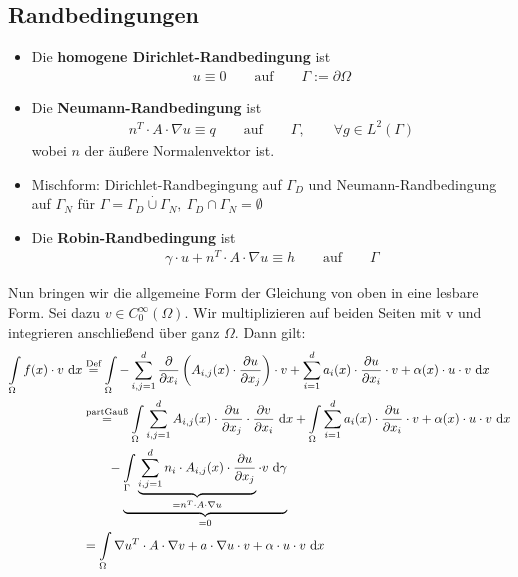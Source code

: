 \subsection*{Randbedingungen}
\begin{itemize}
\item Die \textbf{homogene Dirichlet-Randbedingung} ist
\begin{align*}
u\equiv0\qquad\text{auf}\qquad\Gamma:=\partial\Omega
\end{align*}
\item Die \textbf{Neumann-Randbedingung} ist
\begin{align*}
n^T\cdot A\cdot\nabla u\equiv q\qquad\text{auf}\qquad\Gamma,\qquad\forall g\in L^2(\Gamma)
\end{align*}
wobei $n$ der äußere Normalenvektor ist.
\item Mischform: Dirichlet-Randbegingung auf $\Gamma_D$ und Neumann-Randbedingung auf $\Gamma_N$ für $\Gamma=\Gamma_D\stackrel{\cdot}{\cup}\Gamma_N,~\Gamma_D\cap\Gamma_N=\emptyset$
\item Die \textbf{Robin-Randbedingung} ist
\begin{align*}
\gamma\cdot u+n^T\cdot A\cdot\nabla u\equiv h\qquad\text{auf}\qquad\Gamma
\end{align*}
\end{itemize}

Nun bringen wir die allgemeine Form der Gleichung von oben in eine lesbare Form.
Sei dazu $v\in C_0^\infty(\Omega)$. Wir multiplizieren auf beiden Seiten mit v und integrieren anschließend über ganz $\Omega$. Dann gilt:
\begin{align*}
\int\limits_\Omega f(x)\cdot v\text{ d} x
&\stackrel{\text{Def}}{=}
\int\limits_\Omega-\sum\limits_{i,j=1}^d\frac{\partial}{\partial x_i}\left(A_{i,j}(x)\cdot\frac{\partial u}{\partial x_j}\right)\cdot v+\sum\limits_{i=1}^d a_i(x)\cdot\frac{\partial u}{\partial x_i}\cdot v+\alpha(x)\cdot u\cdot v\text{ d} x\\ 
&\stackrel{\text{partGauß}}{=}
\int\limits_\Omega\sum\limits_{i,j=1}^d A_{i,j}(x)\cdot\frac{\partial u}{\partial x_j}\cdot\frac{\partial v}{\partial x_i}\text{ d} x+\int\limits_\Omega\sum\limits_{i=1}^d a_i(x)\cdot\frac{\partial u}{\partial x_i}\cdot v+\alpha(x)\cdot u\cdot v\text{ d} x\\
&\qquad
-\underbrace{\int\limits_\Gamma\underbrace{\sum\limits_{i,j=1}^d n_i\cdot A_{i,j}(x)\cdot\frac{\partial u}{\partial x_j}}_{=n^T\cdot A\cdot\nabla u}\cdot v\text{ d}\gamma}_{=0}\\
&=
\int\limits_\Omega\nabla u^T\cdot A\cdot\nabla v+a\cdot\nabla u\cdot v+\alpha\cdot u\cdot v\text{ d} x
\end{align*}

